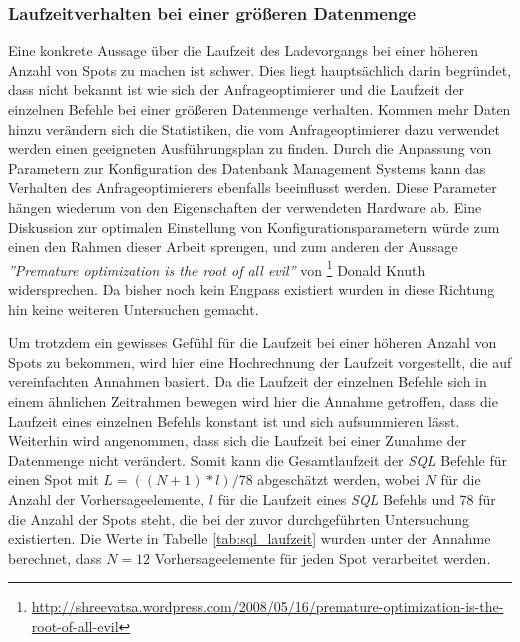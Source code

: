 \subsubsection{Laufzeitverhalten bei einer größeren Datenmenge}
Eine konkrete Aussage über die Laufzeit des Ladevorgangs bei einer
höheren Anzahl von Spots zu machen ist schwer. Dies liegt
hauptsächlich darin begründet, dass nicht bekannt ist wie sich der
Anfrageoptimierer und die Laufzeit der einzelnen Befehle bei einer
größeren Datenmenge verhalten. Kommen mehr Daten hinzu verändern sich
die Statistiken, die vom Anfrageoptimierer dazu verwendet werden einen
geeigneten Ausführungsplan zu finden. Durch die Anpassung von
Parametern zur Konfiguration des Datenbank Management Systems kann das
Verhalten des Anfrageoptimierers ebenfalls beeinflusst werden. Diese
Parameter hängen wiederum von den Eigenschaften der verwendeten
Hardware ab. Eine Diskussion zur optimalen Einstellung von
Konfigurationsparametern würde zum einen den Rahmen dieser Arbeit
sprengen, und zum anderen der Aussage \textit{''Premature optimization
  is the root of all evil''} von
\footnote{\url{http://shreevatsa.wordpress.com/2008/05/16/premature-optimization-is-the-root-of-all-evil}}
Donald Knuth widersprechen. Da bisher noch kein Engpass existiert
wurden in diese Richtung hin keine weiteren Untersuchen gemacht.

Um trotzdem ein gewisses Gefühl für die Laufzeit bei einer höheren
Anzahl von Spots zu bekommen, wird hier eine Hochrechnung der Laufzeit
vorgestellt, die auf vereinfachten Annahmen basiert. Da die Laufzeit
der einzelnen Befehle sich in einem ähnlichen Zeitrahmen bewegen wird
hier die Annahme getroffen, dass die Laufzeit eines einzelnen Befehls
konstant ist und sich aufsummieren lässt. Weiterhin wird angenommen,
dass sich die Laufzeit bei einer Zunahme der Datenmenge nicht
verändert. Somit kann die Gesamtlaufzeit der \textit{SQL} Befehle für
einen Spot mit $L = ((N+1) * l) / 78$ abgeschätzt werden, wobei $N$
für die Anzahl der Vorhersageelemente, $l$ für die Laufzeit eines
\textit{SQL} Befehls und 78 für die Anzahl der Spots steht, die bei
der zuvor durchgeführten Untersuchung existierten. Die Werte in
Tabelle \ref{tab:sql_laufzeit} wurden unter der Annahme berechnet,
dass $N=12$ Vorhersageelemente für jeden Spot verarbeitet werden.

